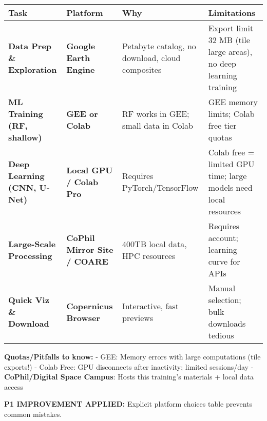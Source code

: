 \documentclass[
  letterpaper,
  DIV=11,
  numbers=noendperiod]{scrartcl}
\begin{document}
\begin{longtable}[]{@{}
  >{\raggedright\arraybackslash}p{}
  >{\raggedright\arraybackslash}p{}
  >{\raggedright\arraybackslash}p{}
  >{\raggedright\arraybackslash}p{}@{}}
\toprule\noalign{}
\begin{minipage}[b]{\linewidth}\raggedright
\textbf{Task}
\end{minipage} & \begin{minipage}[b]{\linewidth}\raggedright
\textbf{Platform}
\end{minipage} & \begin{minipage}[b]{\linewidth}\raggedright
\textbf{Why}
\end{minipage} & \begin{minipage}[b]{\linewidth}\raggedright
\textbf{Limitations}
\end{minipage} \\
\midrule\noalign{}
\endhead
\bottomrule\noalign{}
\endlastfoot
\textbf{Data Prep \& Exploration} & \textbf{Google Earth Engine} &
Petabyte catalog, no download, cloud composites & Export limit 32 MB
(tile large areas), no deep learning training \\
\textbf{ML Training (RF, shallow)} & \textbf{GEE or Colab} & RF works in
GEE; small data in Colab & GEE memory limits; Colab free tier quotas \\
\textbf{Deep Learning (CNN, U-Net)} & \textbf{Local GPU / Colab Pro} &
Requires PyTorch/TensorFlow & Colab free = limited GPU time; large
models need local resources \\
\textbf{Large-Scale Processing} & \textbf{CoPhil Mirror Site / COARE} &
400TB local data, HPC resources & Requires account; learning curve for
APIs \\
\textbf{Quick Viz \& Download} & \textbf{Copernicus Browser} &
Interactive, fast previews & Manual selection; bulk downloads tedious \\
\end{longtable}

\textbf{Quotas/Pitfalls to know:} - GEE: Memory errors with large
computations (tile exports!) - Colab Free: GPU disconnects after
inactivity; limited sessions/day - \textbf{CoPhil/Digital Space Campus}:
Hosts this training's materials + local data access

\textbf{P1 IMPROVEMENT APPLIED:} Explicit platform choices table
prevents common mistakes.
\end{document}
